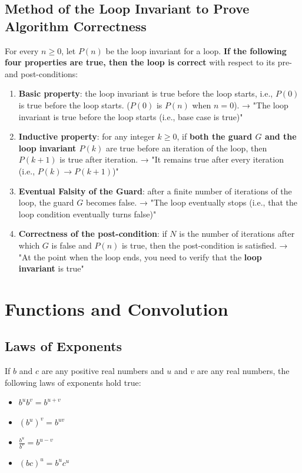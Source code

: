 \subsection{Method of the Loop Invariant to Prove Algorithm Correctness}

For every $n \geq 0$, let $P(n)$ be the loop invariant for a loop. \textbf{If the following four properties are true, then the loop is correct} with respect to its pre- and post-conditions:

\begin{enumerate}
  \item \textbf{Basic property}: the loop invariant is true before the loop starts, i.e., $P(0)$ is true before the loop starts. ($P(0)$ is $P(n)$ when $n = 0$). → "The loop invariant is true before the loop starts (i.e., base case is true)"
  \item \textbf{Inductive property}: for any integer $k \geq 0$, if \textbf{both the guard $G$ and the loop invariant $P(k)$} are true before an iteration of the loop, then $P(k+1)$ is true after iteration. → "It remains true after every iteration (i.e., $P(k) \to P(k+1)$)"
  \item \textbf{Eventual Falsity of the Guard}: after a finite number of iterations of the loop, the guard $G$ becomes false. → "The loop eventually stops (i.e., that the loop condition eventually turns false)"
  \item \textbf{Correctness of the post-condition}: if $N$ is the number of iterations after which $G$ is false and $P(n)$ is true, then the post-condition is satisfied. → "At the point when the loop ends, you need to verify that the \textbf{loop invariant} is true"
\end{enumerate}

\section{Functions and Convolution}
\label{sec:functions-and-convolution}

\subsection{Laws of Exponents}
If $b$ and $c$ are any positive real numbers and $u$ and $v$ are any real numbers, the following laws of exponents hold true:

\begin{itemize}
  \item $b^{u}b^{v} = b^{u+v}$
  \item $(b^{u})^{v} = b^{uv}$
  \item $\frac{b^{u}}{b^{v}} = b^{u-v}$
  \item $(bc)^{u} = b^{u}c^{u}$
\end{itemize}

